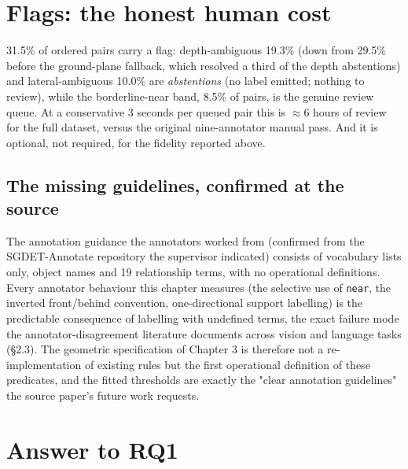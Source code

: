 \section{Flags: the honest human cost}

31.5\% of ordered pairs carry a flag: depth-ambiguous 19.3\% (down from 29.5\% before the ground-plane fallback, which resolved a third of the depth abstentions) and lateral-ambiguous 10.0\% are \textit{abstentions} (no label emitted; nothing to review), while the borderline-near band, 8.5\% of pairs, is the genuine review queue. At a conservative 3 seconds per queued pair this is $\approx$6 hours of review for the full dataset, versus the original nine-annotator manual pass. And it is optional, not required, for the fidelity reported above.

\subsection{The missing guidelines, confirmed at the source}

The annotation guidance the annotators worked from (confirmed from the SGDET-Annotate repository the supervisor indicated) consists of vocabulary lists only, object names and 19 relationship terms, with no operational definitions. Every annotator behaviour this chapter measures (the selective use of \texttt{near}, the inverted front/behind convention, one-directional support labelling) is the predictable consequence of labelling with undefined terms, the exact failure mode the annotator-disagreement literature documents across vision and language tasks (\S2.3). The geometric specification of Chapter 3 is therefore not a re-implementation of existing rules but the first operational definition of these predicates, and the fitted thresholds are exactly the "clear annotation guidelines" the source paper's future work requests.

\section{Answer to RQ1}

